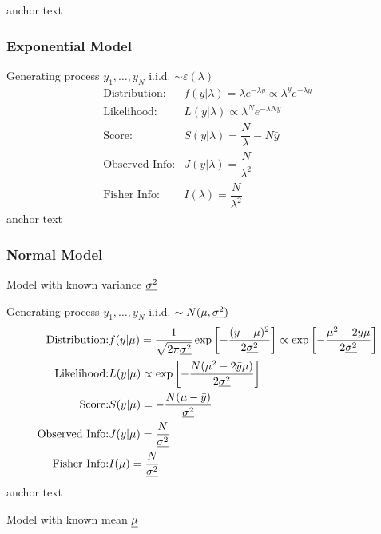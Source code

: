 \hypertarget{PoissonConjugate}{anchor text}


\subsubsection{Exponential Model}\label{SubSubSectionBayesianExp}

Generating process $ y_1,\ldots,y_N $ i.i.d. $ \sim \varepsilon (\lambda ) $
\begin{align*}
    \text{Distribution:}&f(y|\lambda )=\lambda e^{-\lambda y}\propto\lambda ^ye^{-\lambda y }\\
    \text{Likelihood:}&L(y|\lambda )\propto \lambda^{N}e^{-\lambda N\bar{y} } \\
    \text{Score:}&S(y|\lambda )=\dfrac{N}{\lambda }-N\bar{y}\\
    \text{Observed Info:}&J(y|\lambda )=\dfrac{N}{\lambda^2 }\\
    \text{Fisher Info:}&I(\lambda )=\dfrac{N}{\lambda^2 }
\end{align*}
\hypertarget{ExpConjugate}{anchor text}


\subsubsection{Normal Model}\label{SubSubSectionBayesianNormal}
\begin{point}
    Model with known variance $ \underline{\sigma ^2} $
\end{point}

Generating process $ y_1,\ldots,y_N $ i.i.d. $ \sim N(\mu ,\underline{\sigma ^2}) $
\begin{align*}
    \text{Distribution:}&f(y|\mu  )=\dfrac{1}{\sqrt{2\pi\underline{\sigma^2}}}\exp\left[ -\dfrac{(y-\mu )^2}{2\underline{\sigma ^2}} \right]\propto \exp\left[ -\dfrac{\mu ^2-2y\mu }{2\underline{\sigma ^2}} \right]\\
    \text{Likelihood:}&L( y|\mu)\propto  \exp\left[ -\dfrac{N(\mu ^2-2\bar{y}\mu) }{2\underline{\sigma ^2}} \right] \\
    \text{Score:}&S(y|\mu)= -\dfrac{N(\mu -\bar{y})}{\underline{\sigma ^2}}\\
    \text{Observed Info:}&J(y|\mu)=\dfrac{N}{\underline{\sigma ^2}}\\
    \text{Fisher Info:}&I(\mu  )=\dfrac{N}{\underline{\sigma ^2} }
\end{align*}
\hypertarget{NormalWithVarConjugate}{anchor text}

\begin{point}
    Model with known mean $ \underline{\mu} $
\end{point}


